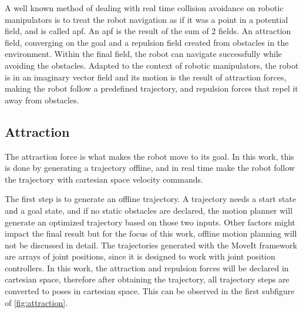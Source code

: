 \par A well known method of dealing with real time collision avoidance on robotic manipulators is to treat the robot navigation as if it was a point in a potential field, and is called \ac{apf}. An \ac{apf} is the result of the sum of 2 fields. An attraction field, converging on the goal and a repulsion field created from obstacles in the environment. Within the final field, the robot can navigate successfully while avoiding the obstacles. Adapted to the context of robotic manipulators, the robot is in an imaginary vector field and its motion is the result of attraction forces, making the robot follow a predefined trajectory, and repulsion forces that repel it away from obstacles.



\subsection{Attraction}
\label{ssec:attraction}


\par The attraction force is what makes the robot move to its goal. In this work, this is done by generating a trajectory offline, and in real time make the robot follow the trajectory with cartesian space velocity commands.

\par The first step is to generate an offline trajectory. A trajectory needs a start state and a goal state, and if no static obstacles are declared, the motion planner will generate an optimized trajectory based on those two inputs. Other factors might impact the final result but for the focus of this work, offline motion planning will not be discussed in detail. The trajectories generated with the MoveIt framework are arrays of joint positions, since it is designed to work with joint position controllers. In this work, the attraction and repulsion forces will be declared in cartesian space, therefore after obtaining the trajectory, all trajectory steps are converted to poses in cartesian space. This can be observed in the first subfigure of \autoref{fig:attraction}.

